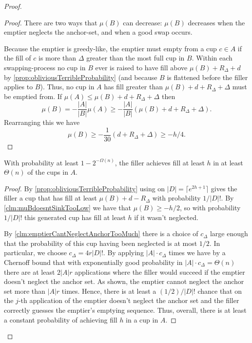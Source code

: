 \begin{proof}
\begin{proof}
  There are two ways that $\mu(B)$ can decrease: $\mu(B)$
  decreases when the emptier neglects the anchor-set, and
  when a good swap occurs. 

  Because the emptier is greedy-like, the emptier must empty from
  a cup $c\in A$ if the fill of $c$ is more than $\Delta$ greater
  than the most full cup in $B$. Within each swapping-process no
  cup in $B$ ever is raised to have fill above $\mu(B) + R_\Delta
  + d$ by \cref{prop:obliviousTerribleProbability} (and because
  $B$ is flattened before the filler applies \randalg to $B$).
  Thus, no cup in $A$ has fill greater than $\mu(B) + d +
  R_\Delta + \Delta$
  must be emptied from. If $\mu(A) \le \mu(B) + d +
  R_\Delta + \Delta$ then
  $$\mu(B) = -\frac{|A|}{|B|}\mu(A) \ge
  -\frac{|A|}{|B|}\left(\mu(B) + d + R_\Delta + \Delta\right).$$
  Rearranging this we have
  $$\mu(B) \ge -\frac{1}{30}(d + R_\Delta + \Delta) \ge -h/4.$$

\end{proof}

\begin{clm}
With probability at least $1-2^{-\Omega(n)}$, the filler achieves fill
at least $h$ in at least $\Theta(n)$ of the cups in $A$. 
\end{clm}
\begin{proof}
  By \cref{prop:obliviousTerribleProbability} using \randalg on
  $|D| = \lceil e^{2h+1} \rceil$ gives the filler a cup that
  has fill at least $\mu(B) + d-R_\Delta$ with probability
  $1/|D|!$. By \cref{clm:muBdoesntSinkTooLow} we have that
  $\mu(B) \ge -h/2$, so with probability $1/|D|!$ this generated
  cup has fill at least $h$ if it wasn't neglected.

  By \cref{clm:emptierCantNeglectAnchorTooMuch} there is a choice
  of $c_\Delta$ large enough that the probability of this cup
  having been neglected is at most $1/2$. In particular, we
  choose $c_\Delta = 4r|D|!$. By applying \randalg $|A|\cdot
  c_\Delta$ times we have by a Chernoff bound that with
  exponentially good probability in $|A|\cdot c_\Delta =
  \Theta(n)$ there are at least $2|A|r$ applications where the
  filler would succeed if the emptier doesn't neglect the anchor
  set. As shown, the emptier cannot
  neglect the anchor set more than $|A|r$ times. Hence, there
  is at least a $(1/2)/|D|!$ chance that on the $j$-th
  application of \randalg the emptier doesn't neglect the anchor
  set and the filler correctly guesses the emptier's emptying
  sequence. Thus, overall, there is at least a constant
  probability of achieving fill $h$ in a cup in $A$.


\end{proof}
\end{proof}
